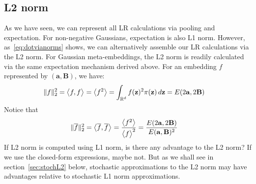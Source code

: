 \documentclass[a4paper,oneside,12pt,english]{report}
\def\zvec{\mathbf{z}}
\def\expv#1#2{\bigl\langle#1\bigr\rangle_{#2}}
\def\expp#1{\bigl\langle#1\bigr\rangle}
\def\R{\mathbb{R}}
\def\Bmat{\mathbf{B}}
\def\Imat{\mathbf{I}}
\def\avec{\mathbf{a}}
\def\dot#1#2{\expv{#1,#2}{}}
\def\normal#1{\overline{#1}}
\def\dotn#1#2{\dot{\normal{#1}}{\normal{#2}}}
\begin{document}
\subsection{L2 norm}
As we have seen, we can represent all LR calculations via pooling and expectation. For non-negative Gaussians, expectation is also L1 norm.  However, as~\eqref{eq:dotvianorms} shows, we can alternatively assemble our LR calculations via the L2 norm. For Gaussian meta-embeddings, the L2 norm is readily calculated via the same expectation mechanism derived above. For an embedding $f$ represented by $(\avec,\Bmat)$, we have:
\begin{align}
\norm{f}^2 &= \dot{f}{f} = \expp{f^2} = \int_{\R^d}f(\zvec)^2\pi(\zvec)\,d\zvec = E(2\avec,2\Bmat)
\end{align}  
Notice that 
\begin{align}
\label{eq:MVG_normalL2}
\norm{\normal{f}}^2 &= \dotn{f}{f} = \frac{\expp{f^2}}{\expp{f}^2} = \frac{E(2\avec,2\Bmat)}{E(\avec,\Bmat)^2}
\end{align}  
If L2 norm is computed using L1 norm, is there any advantage to the L2 norm? If we use the closed-form expressions, maybe not. But as we shall see in section~\ref{sec:stochL2} below, stochastic approximations to the L2 norm may have advantages relative to stochastic L1 norm approximations.



\end{document}
